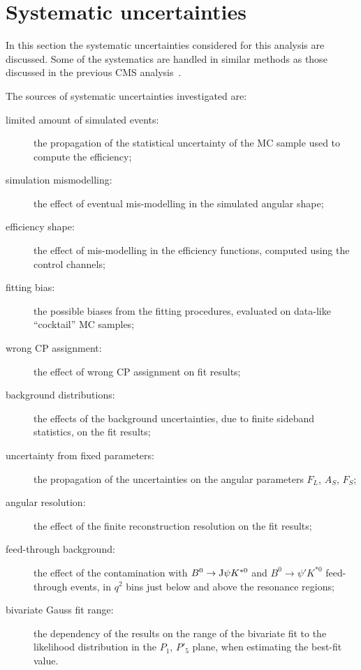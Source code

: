 \chapter{Systematic uncertainties}\label{sec:syst}

In this section the systematic uncertainties considered for this analysis are discussed.
Some of the systematics are handled in similar methods as those discussed in the previous CMS analysis~\cite{Khachatryan:2015isa}.

The sources of systematic uncertainties investigated are:
\begin{description}
\item[limited amount of simulated events:] the propagation of the statistical uncertainty of the MC sample used to compute the efficiency;

\item[simulation mismodelling:] the effect of eventual mis-modelling in the simulated angular shape;

\item[efficiency shape:] the effect of mis-modelling in the efficiency functions, computed using the control channels;

\item[fitting bias:] the possible biases from the fitting procedures, evaluated on data-like ``cocktail'' MC samples;

\item[wrong CP assignment:] the effect of wrong CP assignment on fit results;

\item[background distributions:] the effects of the background \pdf uncertainties, due to finite sideband statistics, on the fit results;

\item[uncertainty from fixed \pdf parameters:] the propagation of the uncertainties on the angular parameters $F_L$, $A_S$, $F_S$;

\item[angular resolution:] the effect of the finite reconstruction resolution on the fit results;
  
\item[feed-through background:] the effect of the contamination with $B^0 \to {\rm J}\psi K^{*0}$ and $B^0 \to \psi' K^{*0}$ feed-through events, in $q^2$ bins just below and above the resonance regions;

\item[bivariate Gauss fit range:] the dependency of the results on the range of the bivariate fit to the likelihood distribution in the $P_1$, $P'_5$ plane, when estimating the best-fit value.

\end{description}

